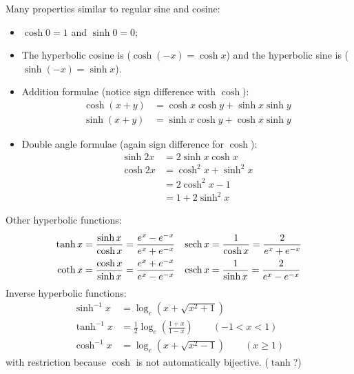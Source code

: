 Many properties similar to regular sine and cosine:
\begin{itemize}
\item $\cosh 0 =1$ and $\sinh 0= 0$;
\item The hyperbolic cosine is  ($\cosh(-x) = \cosh x$) and the hyperbolic sine is  ($\sinh(-x) = \sinh x$).
\item Addition formulae (notice sign difference with $\cosh$):
\begin{align*}
\cosh(x+y) &= \cosh x\cosh y + \sinh x\sinh y \\
\sinh(x+y) &= \sinh x\cosh y + \cosh x\sinh y
\end{align*}
\item Double angle formulae (again sign difference for $\cosh$):
\begin{align*}
\sinh 2x &= 2\sinh x\cosh x \\
\cosh 2x &= \cosh^2 x + \sinh^2 x \\
&= 2\cosh^2 x - 1 \\
&= 1 + 2\sinh^2 x
\end{align*}
\end{itemize}
Other hyperbolic functions:
\begin{align*}
\tanh x &= \frac{\sinh x}{\cosh x} = \frac{e^x - e^{-x}}{e^x + e^{-x}} & \operatorname{sech} x &= \frac{1}{\cosh x} = \frac{2}{e^x + e^{-x}} \\
\coth x &= \frac{\cosh x}{\sinh x} = \frac{e^x + e^{-x}}{e^x - e^{-x}} & \operatorname{csch} x &= \frac{1}{\sinh x} = \frac{2}{e^x - e^{-x}}
\end{align*}
Inverse hyperbolic functions:
\begin{align*}
\sinh^{-1} x &= \log_e \left(x + \sqrt{x^2 + 1}\right) \\
\tanh^{-1} x &= \frac{1}{2}\log_{e} \left(\frac{1+x}{1-x}\right) \qquad (-1< x <1) \\
\cosh^{-1} x &= \log_e \left(x + \sqrt{x^2 - 1}\right) \qquad (x \geq 1)
\end{align*}
with restriction because $\cosh$ is not automatically bijective. ($\tanh$?)
